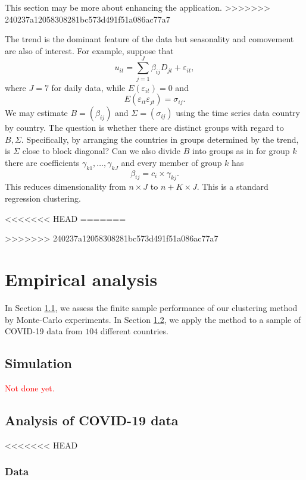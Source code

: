 \documentclass[a4paper,12pt]{article}
\numberwithin{equation}{section}
\begin{document}
This section may be more about enhancing the application. 
>>>>>>> 240237a12058308281bc573d491f51a086ac77a7

The trend is the dominant feature of the data but seasonality and comovement
are also of interest. For example, suppose that 
\[
u_{it}=\sum_{j=1}^{J}\beta _{ij}D_{jt}+\varepsilon _{it},
\]%
where $J=7$ for daily data, while $E(\varepsilon _{it})=0$ and 
\[
E(\varepsilon _{it}\varepsilon _{jt})=\sigma _{ij}.
\]%
We may estimate $B=(\beta _{ij})$ and $\Sigma =(\sigma _{ij})$ using the
time series data country by country. The question is whether there are
distinct groups with regard to $B,\Sigma .$ Specifically, by arranging the
countries in groups determined by the trend, is $\Sigma $ close to block
diagonal? Can we also divide $B$ into groups as in for group $k$ there are
coefficients $\gamma _{k1},\ldots ,\gamma _{kJ}$ and every member of group $k$ has 
\[
\beta _{ij}=c_{i}\times \gamma _{kj}.
\]%
This reduces dimensionality from $n\times J$ to $n+K\times J.$ This is a
standard regression clustering.


<<<<<<< HEAD
=======

>>>>>>> 240237a12058308281bc573d491f51a086ac77a7
\newpage
\section{Empirical analysis}\label{sec:app}


In Section \ref{subsec:sim}, we assess the finite sample performance of our clustering method by Monte-Carlo experiments. In Section \ref{subsec:app}, we apply the method to a sample of COVID-19 data from $104$ different countries. 



\subsection{Simulation}\label{subsec:sim}


\textcolor{red}{Not done yet.} 


\subsection{Analysis of COVID-19 data}\label{subsec:app}

<<<<<<< HEAD

\subsubsection{Data}
\end{document}
